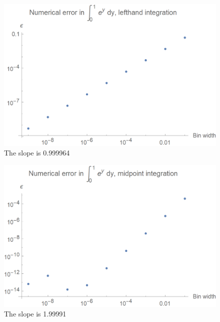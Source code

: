 \documentclass{article}
\begin{document}
\bigskip
{}
\medskip

\begin{figure}[h]
    \centering
    \includegraphics[width=5in]{homework2/P2.png}
    \caption{The slope is 0.999964}
    \label{fig:p2}
\end{figure}

\bigskip
{}
\medskip

\begin{figure}[h]
    \centering
    \includegraphics[width=5in]{homework2/P3.png}
    \caption{The slope is 1.99991}
    \label{fig:p3}
\end{figure}

\bigskip
{}
\medskip


\bigskip
{}
\medskip
\end{document}
